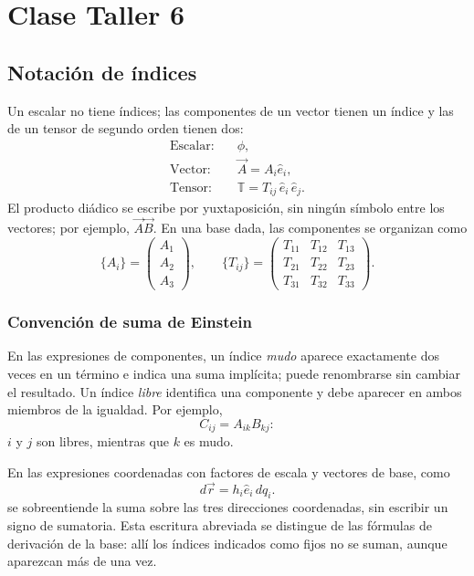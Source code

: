 \chapter{Clase Taller 6}

\section{Notación de índices}

Un escalar no tiene índices; las componentes de un vector tienen un índice y las de un tensor de segundo orden tienen dos:
\[
\begin{aligned}
\text{Escalar:}\quad &\phi,\\
\text{Vector:}\quad &\vec A=A_i\hat e_i,\\
\text{Tensor:}\quad &\mathbb T=
T_{ij}\,\hat e_i\,\hat e_j.
\end{aligned}
\]
El producto diádico se escribe por yuxtaposición, sin ningún símbolo entre los vectores; por ejemplo, $\vec A\vec B$. En una base dada, las componentes se organizan como
\[
\{A_i\}=\begin{pmatrix}A_1\\A_2\\A_3\end{pmatrix},
\qquad
\{T_{ij}\}=\begin{pmatrix}
T_{11}&T_{12}&T_{13}\\
T_{21}&T_{22}&T_{23}\\
T_{31}&T_{32}&T_{33}
\end{pmatrix}.
\]

\subsection{Convención de suma de Einstein}

En las expresiones de componentes, un índice \emph{mudo} aparece exactamente dos veces en un término e indica una suma implícita; puede renombrarse sin cambiar el resultado. Un índice \emph{libre} identifica una componente y debe aparecer en ambos miembros de la igualdad. Por ejemplo,
\[
C_{ij}=A_{ik}B_{kj}:
\]
$i$ y $j$ son libres, mientras que $k$ es mudo.

En las expresiones coordenadas con factores de escala y vectores de base, como
\[
d\vec r=h_i\hat e_i\,dq_i.
\]
se sobreentiende la suma sobre las tres direcciones coordenadas, sin escribir un signo de sumatoria. Esta escritura abreviada se distingue de las fórmulas de derivación de la base: allí los índices indicados como fijos no se suman, aunque aparezcan más de una vez.

